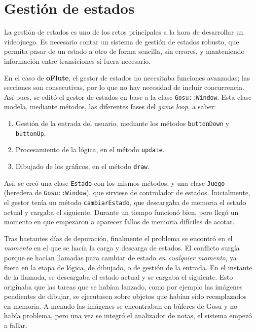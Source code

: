 \section{Gestión de estados}
\label{sec:implementacion_estados}

La gestión de estados es uno de los retos principales a la hora de desarrollar
un videojuego. Es necesario contar un sistema de gestión de estados robusto, que
permita pasar de un estado a otro de forma sencilla, sin errores, y manteniendo
información entre transiciones si fuera necesario.

En el caso de \textbf{oFlute}, el gestor de estados no necesitaba funciones
avanzadas; las secciones son consecutivas, por lo que no hay necesidad de
incluir concurrencia. Así pues, se editó el gestor de estados en base a la clase
\texttt{Gosu::Window}. Esta clase modela, mediante métodos, las diferentes fases
del \textit{game loop}, a saber:
\begin{enumerate}
\item Gestión de la entrada del usuario, mediante los métodos
  \texttt{buttonDown} y \texttt{buttonUp}.
\item Procesamiento de la lógica, en el método \texttt{update}.
\item Dibujado de los gráficos, en el método \texttt{draw}.
\end{enumerate}

Así, se creó una clase \texttt{Estado} con los mismos métodos, y una clase
\texttt{Juego} (heredera de \texttt{Gosu::Window}), que sirviese de controlador
de estados. Inicialmente, el gestor tenía un método \texttt{cambiarEstado}, que
descargaba de memoria el estado actual y cargaba el siguiente. Durante un tiempo
funcionó bien, pero llegó un momento en que empezaron a aparecer fallos de
memoria difíciles de acotar.

Tras bastantes días de depuración, finalmente el problema se encontró en el
\textit{momento} en el que se hacía la carga y descarga de estados. El conflicto
surgía porque se hacían llamadas para cambiar de estado \textit{en cualquier
  momento}, ya fuera en la etapa de lógica, de dibujado, o de gestión de la
entrada. En el instante de la llamada, se descargaba el estado actual y se
cargaba el siguiente. Esto originaba que las tareas que se habían lanzado, como
por ejemplo las imágenes pendientes de dibujar, se ejecutasen sobre objetos que
habían sido reemplazados en memoria. A menudo las imágenes se encontraban en
búferes de Gosu y no había problema, pero una vez se integró el analizador de
notas, el sistema empezó a fallar.

